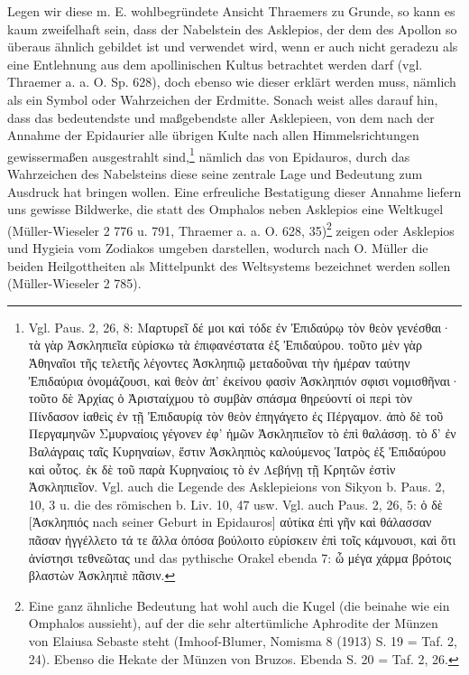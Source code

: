 \documentclass[a4paper, 11pt, oneside]{article}
\begin{document}
Legen wir diese m. E. wohlbegründete Ansicht Thraemers zu Grunde, so kann es kaum zweifelhaft sein, dass der Nabelstein des Asklepios, der dem des Apollon so überaus ähnlich gebildet ist und verwendet wird, wenn er auch nicht geradezu als eine Entlehnung aus dem apollinischen Kultus betrachtet werden darf (vgl. Thraemer a. a. O. Sp. 628), doch ebenso wie dieser erklärt werden muss, nämlich als ein Symbol oder Wahrzeichen der Erdmitte. Sonach weist alles darauf hin, dass das bedeutendste und maßgebendste aller Asklepieen, von dem nach der Annahme der Epidaurier alle übrigen Kulte nach allen Himmelsrichtungen gewissermaßen ausgestrahlt sind,\footnote{Vgl. Paus. 2, 26, 8: Μαρτυρεῖ δέ μοι καὶ τόδε ἐν Ἐπιδαύρῳ τὸν θεὸν γενέσθαι· τὰ γὰρ Ἀσκληπιεῖα εὑρίσκω τὰ ἐπιφανέστατα ἐξ Ἐπιδαύρου. τοῦτο μὲν γὰρ Ἀθηναῖοι τῆς τελετῆς λέγοντες Ἀσκληπιῷ μεταδοῦναι τὴν ἡμέραν ταύτην Ἐπιδαύρια ὀνομάζουσι, καὶ θεὸν ἀπ' ἐκείνου φασὶν Ἀσκληπιόν σφισι νομισθῆναι· τοῦτο δὲ Ἀρχίας ὁ Ἀρισταίχμου τὸ συμβὰν σπάσμα θηρεύοντί οἱ περὶ τὸν Πίνδασον ἰαθεὶς ἐν τῇ Ἐπιδαυρίᾳ τὸν θεὸν ἐπηγάγετο ἐς Πέργαμον. ἀπὸ δὲ τοῦ Περγαμηνῶν Σμυρναίοις γέγονεν ἐφ' ἡμῶν Ἀσκληπιεῖον τὸ ἐπὶ θαλάσσῃ. τὸ δ' ἐν Βαλάγραις ταῖς Κυρηναίων, ἔστιν Ἀσκληπιὸς καλούμενος Ἰατρὸς ἐξ Ἐπιδαύρου καὶ οὗτος. ἐκ δὲ τοῦ παρὰ Κυρηναίοις τὸ ἐν Λεβήνῃ τῇ Κρητῶν ἐστὶν Ἀσκληπιεῖον. Vgl. auch die Legende des Asklepieions von Sikyon b. Paus. 2, 10, 3 u. die des römischen b. Liv. 10, 47 usw. Vgl. auch Paus. 2, 26, 5: ὁ δὲ [Ἀσκληπιός nach seiner Geburt in Epidauros] αὐτίκα ἐπὶ γῆν καὶ θάλασσαν πᾶσαν ἠγγέλλετο τά τε ἄλλα ὁπόσα βούλοιτο εὑρίσκειν ἐπὶ τοῖς κάμνουσι, καὶ ὅτι ἀνίστησι τεθνεῶτας und das pythische Orakel ebenda 7: ὦ μέγα χάρμα βρότοις βλαστὼν Ἀσκληπιὲ πᾶσιν.} nämlich das von Epidauros, durch das Wahrzeichen des Nabelsteins diese seine zentrale Lage und Bedeutung zum Ausdruck hat bringen wollen. Eine erfreuliche Bestatigung dieser Annahme liefern uns gewisse Bildwerke, die statt des Omphalos neben Asklepios eine Weltkugel (Müller-Wieseler 2 776 u. 791, Thraemer a. a. O. 628, 35)\footnote{Eine ganz ähnliche Bedeutung hat wohl auch die Kugel (die beinahe wie ein Omphalos aussieht), auf der die sehr altertümliche Aphrodite der Münzen von Elaiusa Sebaste steht (Imhoof-Blumer, Nomisma 8 (1913) S. 19 = Taf. 2, 24). Ebenso die Hekate der Münzen von Bruzos. Ebenda S. 20 = Taf. 2, 26.} zeigen oder Asklepios und Hygieia vom Zodiakos umgeben darstellen, wodurch nach O. Müller die beiden Heilgottheiten als Mittelpunkt des Weltsystems bezeichnet werden sollen (Müller-Wieseler 2 785).
\end{document}
